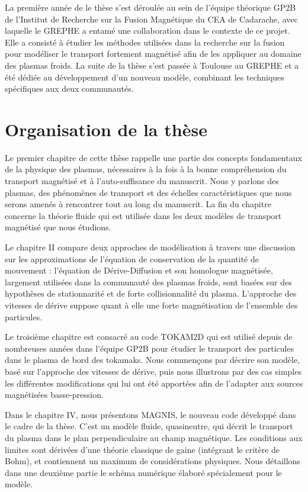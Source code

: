 \begin{refsection}
 La première année de
 le thèse s'est déroulée au sein de l'équipe théorique GP2B de l'Institut de
 Recherche sur la Fusion Magnétique du CEA de Cadarache, avec laquelle le GREPHE
 a entamé une collaboration dans le contexte de ce projet. Elle a consisté à
 étudier les méthodes utilisées dans la recherche
 sur la fusion pour modéliser le transport fortement magnétisé afin de les
 appliquer au domaine des plasmas froids. La suite de la thèse s'est passée à
 Toulouse au GREPHE et a été dédiée au développement d'un nouveau modèle,
 combinant les techniques spécifiques aux deux communautés.
 
\section*{Organisation de la thèse}
	Le premier chapitre de cette thèse rappelle une partie des concepts 
	fondamentaux de la physique des plasmas, nécessaires à la fois à la bonne
	compréhension du transport magnétisé et à l'auto-suffisance du manuscrit. Nous
	y parlons des plasmas, des phénomènes de transport et des échelles
	caractéristiques que nous serons amenés à rencontrer tout au long du manuscrit.
	La fin du chapitre concerne la théorie fluide qui est utilisée dans les deux
	modèles de transport magnétisé que nous étudions.
	
	Le chapitre II compare deux approches de modélisation à travers une
	discussion sur les approximations de l'équation de conservation de la quantité
	de mouvement : l'équation de Dérive-Diffusion et son homologue magnétisée,
	largement utilisées dans la communauté des plasmas froids, sont basées sur des
	hypothèses de stationnarité et de forte collisionnalité du plasma. L'approche
	des vitesses de dérive suppose quant à elle une forte magnétisation de
	l'ensemble des particules.
	
	Le troisième chapitre est consacré au code TOKAM2D qui est utilisé depuis de
	nombreuses années dans l'équipe GP2B pour étudier le transport des particules
	dans le plasma de bord des tokamaks. Nous commençons par décrire son modèle,
	basé sur l'approche des vitesses de dérive, puis nous illustrons par des cas
	 simples les différentes modifications qui lui ont été apportées afin de
	 l'adapter aux sources magnétisées basse-pression.
	
	Dans le chapitre IV, nous présentons MAGNIS, le nouveau code développé dans le
	cadre de la thèse. C'est un modèle fluide, quasineutre, qui décrit le transport
	du plasma dans le plan perpendiculaire au champ magnétique. Les conditions aux
	limites sont dérivées d'une théorie classique de gaine (intégrant le critère
	de Bohm), et contiennent un maximum de considérations physiques. Nous
	détaillons dans une deuxième partie le schéma numérique élaboré spécialement pour le modèle.
	

\end{refsection}
